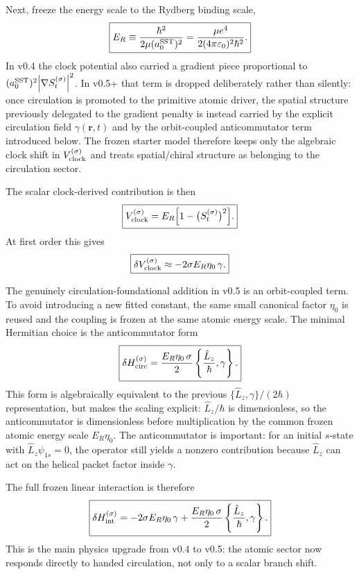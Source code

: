 \documentclass[11pt,a4paper]{article}
\begin{document}
Next, freeze the energy scale to the Rydberg binding scale,
\begin{equation}
\label{eq:ERfreeze}
\boxed{
E_R \equiv \frac{\hbar^2}{2\mu (a_0^{\rm SST})^2}
= \frac{\mu e^4}{2(4\pi\varepsilon_0)^2\hbar^2}.
}
\end{equation}
In v0.4 the clock potential also carried a gradient piece proportional to $(a_0^{\rm SST})^2\abs{\nabla S_t^{(\sigma)}}^2$. In v0.5+ that term is dropped deliberately rather than silently: once circulation is promoted to the primitive atomic driver, the spatial structure previously delegated to the gradient penalty is instead carried by the explicit circulation field $\gamma(\mathbf r,t)$ and by the orbit-coupled anticommutator term introduced below. The frozen starter model therefore keeps only the algebraic clock shift in $V_{\rm clock}^{(\sigma)}$ and treats spatial/chiral structure as belonging to the circulation sector.

The scalar clock-derived contribution is then
\begin{equation}
\label{eq:Vclock}
\boxed{
V_{\rm clock}^{(\sigma)}
=
E_R\Bigl[1-\bigl(S_t^{(\sigma)}\bigr)^2\Bigr].
}
\end{equation}
At first order this gives
\begin{equation}
\label{eq:Vclock-linear}
\boxed{
\delta V_{\rm clock}^{(\sigma)}
\approx
-2\sigma E_R\eta_0\,\gamma.
}
\end{equation}

The genuinely circulation-foundational addition in v0.5 is an orbit-coupled term. To avoid introducing a new fitted constant, the same small canonical factor $\eta_0$ is reused and the coupling is frozen at the same atomic energy scale. The minimal Hermitian choice is the anticommutator form
\begin{equation}
\label{eq:HintCirc}
\boxed{
\delta H_{\rm circ}^{(\sigma)}
=
\frac{E_R\eta_0\,\sigma}{2}
\left\{\frac{\hat L_z}{\hbar},\gamma\right\}.
}
\end{equation}
This form is algebraically equivalent to the previous $\{\hat L_z,\gamma\}/(2\hbar)$ representation, but makes the scaling explicit: $\hat L_z/\hbar$ is dimensionless, so the anticommutator is dimensionless before multiplication by the common frozen atomic energy scale $E_R\eta_0$. The anticommutator is important: for an initial $s$-state with $\hat L_z\psi_{1s}=0$, the operator still yields a nonzero contribution because $\hat L_z$ can act on the helical packet factor inside $\gamma$.

The full frozen linear interaction is therefore
\begin{equation}
\label{eq:HintTotal}
\boxed{
\delta H_{\rm int}^{(\sigma)}
=
-2\sigma E_R\eta_0\,\gamma
+
\frac{E_R\eta_0\,\sigma}{2}
\left\{\frac{\hat L_z}{\hbar},\gamma\right\}.
}
\end{equation}
This is the main physics upgrade from v0.4 to v0.5: the atomic sector now responds directly to handed circulation, not only to a scalar branch shift.
\end{document}

